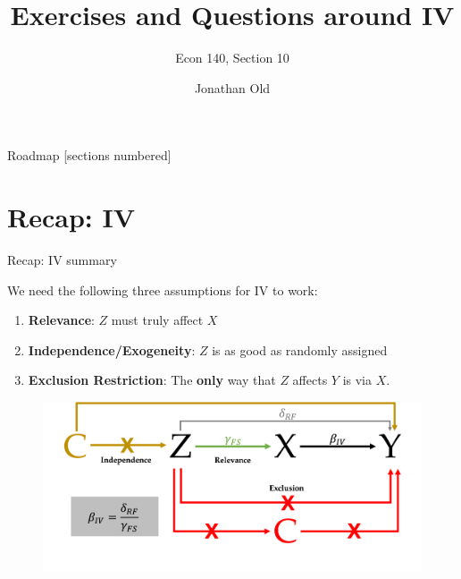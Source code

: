 \documentclass[11pt,xcolor=table]{beamer}
\title{Exercises and Questions around IV
}
\subtitle{Econ 140, Section 10}
\date{}
\author{Jonathan Old}
\begin{document}
\maketitle

\begin{frame}{Roadmap}
  [sections numbered]
  \tableofcontents%
\end{frame}







\section{Recap: IV}


\begin{frame}{Recap: IV summary}

We need the following three assumptions for IV to work: 
    \begin{enumerate}
    \item \textbf{Relevance}: $Z$ must truly affect $X$
    \item \textbf{Independence/Exogeneity}: $Z$ is as good as randomly assigned
    \item \textbf{Exclusion Restriction}: The \textbf{only} way that $Z$ affects $Y$ is via $X$.
    \end{enumerate}



    \begin{figure}
 
        \centering
        \includegraphics[width=1\textwidth]{DAGs/iv_summary_full.png}
        \label{fig:iv3}
    \end{figure}
    
   \end{frame}
\end{document}
